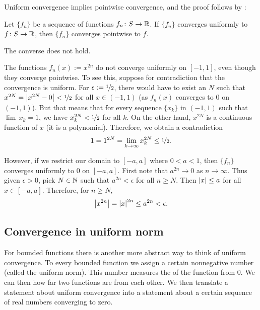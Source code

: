 Uniform convergence
implies pointwise convergence, and the proof follows by
:

\begin{prop}
Let $\{ f_n \}$ be a sequence of functions $f_n \colon S \to {\mathbb{R}}$.
If $\{ f_n \}$ converges
uniformly to $f \colon S \to {\mathbb{R}}$, then $\{ f_n \}$ converges pointwise to $f$.
\end{prop}

The converse does not hold.

\begin{example}
The functions $f_n(x) := x^{2n}$ do not converge uniformly on $[-1,1]$,
even though they converge pointwise.  To see this, suppose for contradiction
that the convergence is uniform.  For $\epsilon := \nicefrac{1}{2}$, there would have
to exist an $N$ such that $x^{2N} = \left\lvert {x^{2N} - 0} \right\rvert < \nicefrac{1}{2}$ for all $x \in
(-1,1)$ (as $f_n(x)$ converges to 0 on $(-1,1)$).  But that means that
for every sequence $\{ x_k \}$ in $(-1,1)$ such that $\lim\, x_k = 1$,
we have $x_k^{2N} < \nicefrac{1}{2}$ for all $k$.  On the other hand,
$x^{2N}$ is a continuous function of $x$ (it is a polynomial).  Therefore,
we obtain a contradiction
\begin{equation*}
1 = 1^{2N}  = \lim_{k\to\infty} x_k^{2N} \leq \nicefrac{1}{2} .
\end{equation*}

However, if we restrict our domain to $[-a,a]$ where $0 < a < 1$, then
$\{ f_n \}$ converges uniformly to 0 on $[-a,a]$.  First note
that $a^{2n} \to 0$ as $n \to \infty$.  Thus given $\epsilon > 0$,
pick $N \in {\mathbb{N}}$ such that
$a^{2n} < \epsilon$ for all $n \geq N$.
Then $\left\lvert {x} \right\rvert \leq a$ for all $x \in [-a,a]$.
Therefore, for $n \geq N$,
\begin{equation*}
\left\lvert {x^{2n}} \right\rvert = \left\lvert {x} \right\rvert^{2n} \leq a^{2n} < \epsilon .
\end{equation*}
\end{example}

\subsection{Convergence in uniform norm}

For bounded functions there is another more abstract way to 
think of uniform convergence.  To every bounded function we assign
a certain nonnegative number (called the uniform norm).  This number
measures the  of the function from 0.  We can then
how far two functions are from each other.  We then translate
a statement about uniform convergence into a statement about a certain
sequence of real numbers converging to zero.

